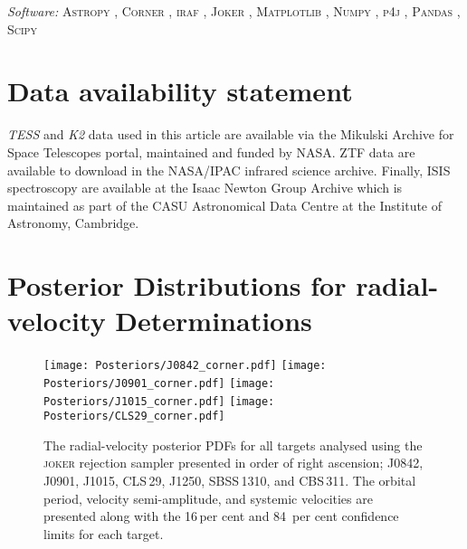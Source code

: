 \documentclass[fleqn,usenatbib,useAMS]{mnras}
\newcommand{\jf}[1]{\textcolor{magenta}{#1}}
\DeclareRobustCommand{\DE}[3]{#3}
\begin{document}
\textit{Software:} \textsc{Astropy} \citep{Astropy}, \textsc{Corner} \citep{corner}, \textsc{iraf} \citep{Iraf}, \textsc{Joker} \citep{Joker}, \textsc{Matplotlib} \citep{Matplotlib}, \textsc{Numpy} \citep{Numpy}, \textsc{p4j} \citep{P4J}, \textsc{Pandas} \citep{pandas}, \textsc{Scipy} \citep{Scipy}


\section*{Data availability statement}


\textit{TESS} and \textit{K2} data used in this article are available via the Mikulski Archive for Space Telescopes portal, maintained and funded by NASA. ZTF data are available to download in the NASA/IPAC infrared science archive. Finally, ISIS spectroscopy are available at the Isaac Newton Group Archive which is maintained as part of the CASU Astronomical Data Centre at the Institute of Astronomy, Cambridge.









\bigskip
\bigskip



\appendix

\section{Posterior Distributions for radial-velocity Determinations}


\begin{figure*}
	\texttt{[image: Posteriors/J0842\_corner.pdf]}
	\texttt{[image: Posteriors/J0901\_corner.pdf]}
 	\texttt{[image: Posteriors/J1015\_corner.pdf]}
 	\texttt{[image: Posteriors/CLS29\_corner.pdf]}
\caption{The radial-velocity posterior PDFs for all targets analysed using the \textsc{joker} rejection sampler presented in order of right ascension; J0842, J0901, J1015, CLS\,29, J1250, SBSS\,1310, and CBS\,311.  The orbital period, velocity semi-amplitude, and systemic velocities are presented along with the 16\,per cent and 84\, per cent confidence limits for each target.}
	\label{fig:all_corner}
\end{figure*}
\end{document}
